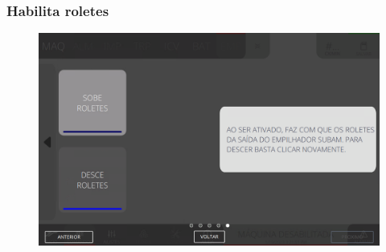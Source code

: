 \newpage
\thispagestyle{fancy}
\vspace*{40 pt}
\subsubsection{\small{Habilita roletes}} \label{sec:telaComandosEmpilhador2HabilitaRoletes}
\vspace*{\fill}
\begin{figure}[h]
    \centering
    \includegraphics[width=576 px,height=360 px]{src/imagesICV/08-stacker/commands/e-5.png}
\end{figure}
\vspace*{\fill}

